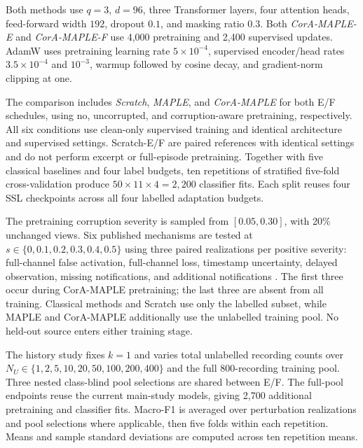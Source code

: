 Both methods use $q=3$, $d=96$, three Transformer layers, four attention heads,
feed-forward width $192$, dropout $0.1$, and masking ratio $0.3$.
Both \emph{CorA-MAPLE-E} and \emph{CorA-MAPLE-F} use 4,000 pretraining
and 2,400 supervised updates. AdamW uses pretraining
learning rate $5\times10^{-4}$, supervised encoder/head rates $3.5\times10^{-4}$
and $10^{-3}$, warmup followed by cosine decay, and gradient-norm clipping at one.

The comparison includes \emph{Scratch}, \emph{MAPLE}, and \emph{CorA-MAPLE} for
both E/F schedules, using no, uncorrupted, and corruption-aware pretraining,
respectively. All six conditions use clean-only supervised training and identical
architecture and supervised settings. Scratch-E/F are paired references with
identical settings and do not perform excerpt or full-episode pretraining. Together with five
classical baselines and four label budgets, ten repetitions of stratified
five-fold cross-validation produce $50\times11\times4=2{,}200$ classifier fits.
Each split reuses four SSL checkpoints across all four labelled adaptation budgets.

The pretraining corruption severity is sampled from $[0.05,0.30]$, with 20\%
unchanged views. Six published mechanisms are tested at
$s\in\{0,0.1,0.2,0.3,0.4,0.5\}$ using three paired realizations per positive
severity: full-channel false activation, full-channel loss, timestamp uncertainty,
delayed observation, missing notifications, and additional notifications
\citep{etfa,robustbench}. The first three occur during CorA-MAPLE pretraining;
the last three are absent from all training. Classical methods and Scratch use
only the labelled subset, while MAPLE and CorA-MAPLE additionally use the unlabelled
training pool. No held-out source enters either training stage.

The history study fixes $k=1$ and varies total unlabelled recording counts over
$N_U\in\{1,2,5,10,20,50,100,200,400\}$ and the full 800-recording training pool.
Three nested class-blind pool selections are shared between E/F. The full-pool
endpoints reuse the current main-study models, giving 2,700 additional pretraining
and classifier fits. Macro-F1 is averaged over perturbation realizations and pool
selections where applicable, then five folds within each repetition. Means and
sample standard deviations are computed across ten repetition means.
